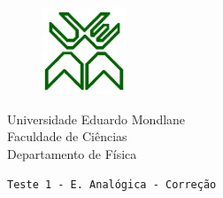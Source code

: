 \documentclass[11pt,a4paper,twoside]{report}
\author{Bartolomeu J. Ubisse}
\begin{document}
\begin{figure}[htb]

\centering
\includegraphics[scale=1]{UEM-logotipo}
\end{figure}
\centering
{ \Large Universidade Eduardo Mondlane}\\[0.3cm] 
\large Faculdade de Ci\^encias\\[0.2cm]
 \large Departamento de F\'isica\\[0.5cm]

\begin{flushleft}
\tt Teste 1 - E. Anal\'ogica - Corre\c c\~ao \\
\hrulefill
\end{flushleft}
\end{document}
